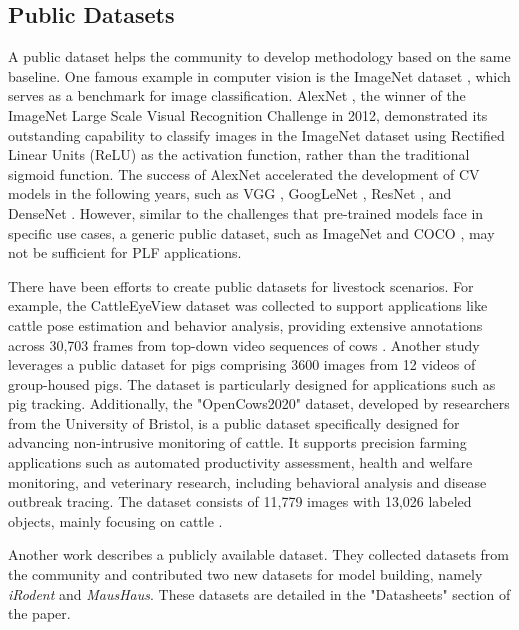 \subsection*{Public Datasets}

A public dataset helps the community to develop methodology based on the same baseline. One famous example in computer vision is the ImageNet dataset \cite{deng2009imagenet}, which serves as a benchmark for image classification. AlexNet \cite{krizhevsky2017imagenet}, the winner of the ImageNet Large Scale Visual Recognition Challenge in 2012, demonstrated its outstanding capability to classify images in the ImageNet dataset using Rectified Linear Units (ReLU) as the activation function, rather than the traditional sigmoid function. The success of AlexNet accelerated the development of CV models in the following years, such as VGG \cite{karen2014very}, GoogLeNet \cite{szegedy2015going}, ResNet \cite{targ2016resnet}, and DenseNet \cite{huang2017densely}. However, similar to the challenges that pre-trained models face in specific use cases, a generic public dataset, such as ImageNet \cite{deng2009imagenet} and COCO \cite{lin2014microsoft}, may not be sufficient for PLF applications. 

There have been efforts to create public datasets for livestock scenarios. For example, the CattleEyeView dataset was collected to support applications like cattle pose estimation and behavior analysis, providing extensive annotations across 30,703 frames from top-down video sequences of cows \cite{ong2023cattleeyeview}. Another study \cite{t2020long} leverages a public dataset for pigs comprising 3600 images from 12 videos of group-housed pigs. The dataset is particularly designed for applications such as pig tracking. Additionally, the "OpenCows2020" dataset, developed by researchers from the University of Bristol, is a public dataset specifically designed for advancing non-intrusive monitoring of cattle. It supports precision farming applications such as automated productivity assessment, health and welfare monitoring, and veterinary research, including behavioral analysis and disease outbreak tracing. The dataset consists of 11,779 images with 13,026 labeled objects, mainly focusing on cattle \cite{visualization-tools-for-opencows2020-dataset}. 

Another work \cite{ye2022superanimal} describes a publicly available dataset. They collected datasets from the community and contributed two new datasets for model building, namely \textit{iRodent} and \textit{MausHaus}. These datasets are detailed in the "Datasheets" section of the paper.

